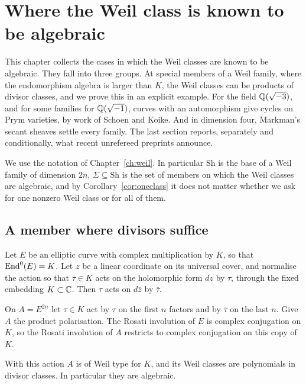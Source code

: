 \chapter{Where the Weil class is known to be algebraic}\label{ch:known}

This chapter collects the cases in which the Weil classes are known to be
algebraic. They fall into three groups. At special members of a Weil family,
where the endomorphism algebra is larger than $K$, the Weil classes can be
products of divisor classes, and we prove this in an explicit example. For
the field $\mathbb{Q}(\sqrt{-3})$, and for some families for $\mathbb{Q}(\sqrt{-1})$,
curves with an automorphism give cycles on Prym varieties, by work of
Schoen and Koike. And in dimension four, Markman's secant sheaves settle
every family. The last section reports, separately and conditionally, what
recent unrefereed preprints announce.

We use the notation of Chapter~\ref{ch:weil}. In particular $\mathrm{Sh}$
is the base of a Weil family of dimension $2n$, $\Sigma\subseteq\mathrm{Sh}$
is the set of members on which the Weil classes are algebraic, and by
Corollary~\ref{cor:oneclass} it does not matter whether we ask for one
nonzero Weil class or for all of them.

\section{A member where divisors suffice}\label{sec:cmpoint}

Let $E$ be an elliptic curve with complex multiplication by $K$, so that
$\operatorname{End}^{0}(E)=K$. Let $z$ be a linear coordinate on its universal cover, and
normalise the action so that $\tau\in K$ acts on the holomorphic form $dz$
by $\tau$, through the fixed embedding $K\subset\mathbb{C}$. Then $\tau$ acts on
$d\bar z$ by $\bar\tau$.

On $A=E^{2n}$ let $\tau\in K$ act by $\tau$ on the first $n$ factors and by
$\bar\tau$ on the last $n$. Give $A$ the product polarisation. The Rosati
involution of $E$ is complex conjugation on $K$, so the Rosati involution of
$A$ restricts to complex conjugation on this copy of $K$.

\begin{proposition}\label{prop:cmexample}
With this action $A$ is of Weil type for $K$, and its Weil classes are
polynomials in divisor classes. In particular they are algebraic.
\end{proposition}

